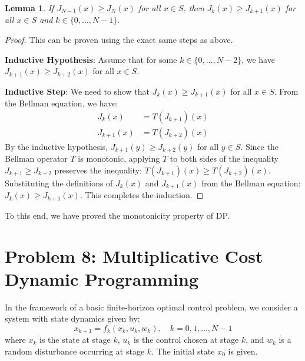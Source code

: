 \documentclass[11pt, a4paper, oneside]{memoir}
\newtheorem{lemma}{Lemma}
\begin{document}
\begin{lemma}
  If $J_{N-1}(x) \ge J_N(x)$ for all $x \in S$, then $J_k(x) \ge J_{k+1}(x)$ for all $x \in S$ and $k \in \{0, \dots, N-1\}$.
\end{lemma}

\begin{proof}
  This can be proven using the exact same steps as above.

  \textbf{Inductive Hypothesis}:
  Assume that for some $k \in \{0, \dots, N-2\}$, we have $J_{k+1}(x) \ge J_{k+2}(x)$ for all $x \in S$.

  \textbf{Inductive Step}:
  We need to show that $J_k(x) \ge J_{k+1}(x)$ for all $x \in S$.
  From the Bellman equation, we have:
  \begin{align*}
    J_k(x) &= T(J_{k+1})(x) \\
    J_{k+1}(x) &= T(J_{k+2})(x)
  \end{align*}
  By the inductive hypothesis, $J_{k+1}(y) \ge J_{k+2}(y)$ for all $y \in S$.
  Since the Bellman operator $T$ is monotonic, applying $T$ to both sides of the inequality $J_{k+1} \ge J_{k+2}$ preserves the inequality:
  $T(J_{k+1})(x) \ge T(J_{k+2})(x)$.
  Substituting the definitions of $J_k(x)$ and $J_{k+1}(x)$ from the Bellman equation:
  $J_k(x) \ge J_{k+1}(x)$.
  This completes the induction.
\end{proof}

To this end, we have proved the monotonicity property of DP.

\chapter{Problem 8: Multiplicative Cost Dynamic Programming}
In the framework of a basic finite-horizon optimal control problem, we consider a system with state dynamics given by:
\[
x_{k+1} = f_k(x_k, u_k, w_k), \quad k = 0, 1, \dots, N-1
\]
where $x_k$ is the state at stage $k$, $u_k$ is the control chosen at stage $k$,
and $w_k$ is a random disturbance occurring at stage $k$. The initial state $x_0$ is given.
\end{document}
